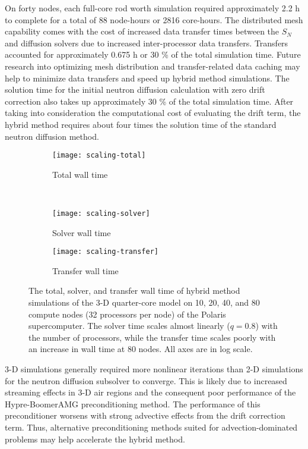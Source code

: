 On forty nodes, each full-core rod worth simulation
required approximately 2.2 h to complete for a total of 88 node-hours or 2816 core-hours. The
distributed mesh capability comes with the cost of increased data transfer times between the $S_N$
and diffusion solvers due to increased inter-processor data transfers. Transfers accounted for
approximately 0.675 h or 30 \% of the total simulation time. Future research into optimizing mesh
distribution and transfer-related data caching may help to minimize data transfers and speed up
hybrid method simulations. The solution time for the initial neutron diffusion calculation with zero
drift correction also takes up approximately 30 \% of the total simulation time. After taking into
consideration the computational cost of evaluating the drift term, the hybrid method
requires about four times the solution time of the standard neutron diffusion method.

\begin{figure}[t]
  \centering
  \begin{subfigure}[b]{0.49\columnwidth}
    \centering
    \texttt{[image: scaling-total]}
    \caption{Total wall time}
  \end{subfigure} \\
  \begin{subfigure}[b]{0.49\columnwidth}
    \centering
    \texttt{[image: scaling-solver]}
    \caption{Solver wall time}
  \end{subfigure}
  \begin{subfigure}[b]{0.49\columnwidth}
    \centering
    \texttt{[image: scaling-transfer]}
    \caption{Transfer wall time}
  \end{subfigure}
  \caption{The total, solver, and transfer wall time of hybrid method simulations of the 3-D
  quarter-core model on 10, 20, 40, and 80 compute nodes (32 processors per node) of the Polaris
  supercomputer. The solver
  time scales almost linearly ($q=0.8$) with the number of processors, while the transfer time
  scales poorly with an increase in wall time at 80 nodes. All axes are in log scale.}
  \label{fig:scaling}
\end{figure}

3-D simulations generally required more nonlinear iterations than 2-D simulations for the neutron
diffusion subsolver to
converge. This is likely due to increased streaming effects in 3-D air regions and the
consequent poor performance of the Hypre-BoomerAMG preconditioning method. The performance of this
preconditioner worsens with strong advective effects from the drift correction term. Thus,
alternative preconditioning methods suited for advection-dominated problems may help accelerate
the hybrid method.

